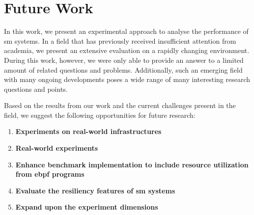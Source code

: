 \section{Future Work}
\label{sec:conclusion:future-work}

In this work, we present an experimental approach to analyse the performance of \gls{sm} systems. In a field that has previously received insufficient attention from academia, we present an extensive evaluation on a rapidly changing environment. During this work, however, we were only able to provide an answer to a limited amount of related questions and problems. Additionally, such an emerging field with many ongoing developments poses a wide range of many interesting research questions and points.

Based on the results from our work and the current challenges present in the field, we suggest the following opportunities for future research:

\begin{enumerate}
    \item \textbf{Experiments on real-world infrastructures}

    \item \textbf{Real-world experiments}
    
    \item \textbf{Enhance benchmark implementation to include resource utilization from \gls{ebpf} programs}
    
    \item \textbf{Evaluate the resiliency features of \gls{sm} systems}
    
    \item \textbf{Expand upon the experiment dimensions}

\end{enumerate}